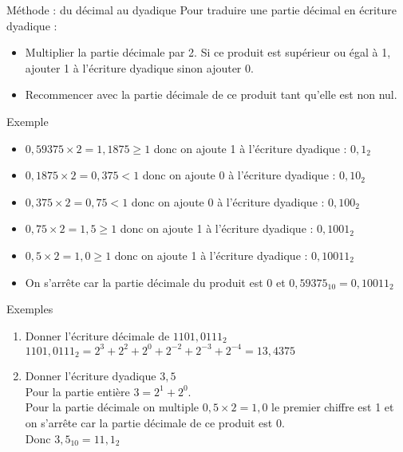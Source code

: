 \documentclass[10pt]{beamer}
\begin{document}
\begin{frame}
    \mframe{\NF}
    \begin{block}{Méthode : du décimal au dyadique}
        Pour traduire une partie décimal en écriture dyadique :
        \begin{itemize}
            \item<2-> Multiplier la partie décimale par 2. Si ce produit est supérieur ou égal à 1, ajouter 1 à l'écriture dyadique sinon ajouter 0.
            \item<3-> Recommencer avec la partie décimale de ce produit tant qu'elle est non nul.
        \end{itemize}
    \end{block}
    \begin{exampleblock}{Exemple}
        \begin{itemize}
            \item<5-> $0,59375 \times 2 = 1,1875 \geq 1$ donc on ajoute 1 à l'écriture dyadique : $0,1_2$
            \item<6-> $0,1875 \times 2 = 0,375 < 1$ donc on ajoute 0 à l'écriture dyadique : $0,10_2$
            \item<7-> $0,375 \times 2 = 0,75 < 1$ donc on ajoute 0 à l'écriture dyadique : $0,100_2$
            \item<8-> $0,75 \times 2 = 1,5 \geq 1$ donc on ajoute 1 à l'écriture dyadique : $0,1001_2$
            \item<9-> $0,5 \times 2 = 1,0 \geq 1$  donc on ajoute 1 à l'écriture dyadique : $0,10011_2$
            \item<10-> On s'arrête car la partie décimale du produit est 0 et $0,59375_{10}=0,10011_2$
        \end{itemize}
    \end{exampleblock}

\end{frame}

\begin{frame}
    \mframe{\NF}
    \begin{exampleblock}{Exemples}
        \begin{enumerate}
            \item<1-> Donner l'écriture décimale de $1101,0111_2$ \\
             \textcolor{OliveGreen}{$1101,0111_2 = 2^3+2^2+2^0+2^{-2}+2^{-3}+2^{-4} = 13,4375$}
            \item<2-> Donner l'écriture dyadique $3,5$\\
             \textcolor{OliveGreen}{Pour la partie entière $3 = 2^1 + 2^0$. \\ Pour la partie décimale on multiple $0,5\times2=1,0$ le premier chiffre est 1 et on s'arrête car la partie décimale de ce produit est 0.\\ Donc $3,5_{10}=11,1_{2}$}
        \end{enumerate}
    \end{exampleblock}
\end{frame}
\end{document}
